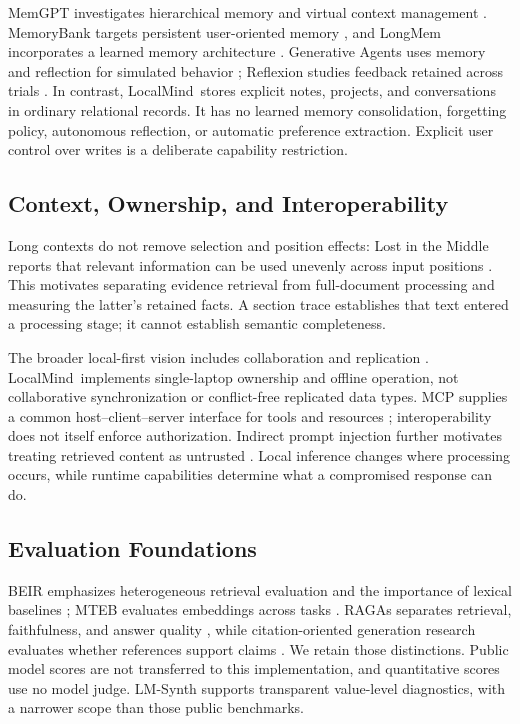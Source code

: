 \documentclass[conference,letterpaper]{IEEEtran}
\newcommand{\method}{LocalMind}
\begin{document}
MemGPT investigates hierarchical memory and virtual context management \cite{memgpt}. MemoryBank targets persistent user-oriented memory \cite{memorybank}, and LongMem incorporates a learned memory architecture \cite{longmem}. Generative Agents uses memory and reflection for simulated behavior \cite{genagents}; Reflexion studies feedback retained across trials \cite{reflexion}. In contrast, \method\ stores explicit notes, projects, and conversations in ordinary relational records. It has no learned memory consolidation, forgetting policy, autonomous reflection, or automatic preference extraction. Explicit user control over writes is a deliberate capability restriction.

\subsection{Context, Ownership, and Interoperability}
Long contexts do not remove selection and position effects: Lost in the Middle reports that relevant information can be used unevenly across input positions \cite{lostmiddle}. This motivates separating evidence retrieval from full-document processing and measuring the latter's retained facts. A section trace establishes that text entered a processing stage; it cannot establish semantic completeness.

The broader local-first vision includes collaboration and replication \cite{localfirst}. \method\ implements single-laptop ownership and offline operation, not collaborative synchronization or conflict-free replicated data types. MCP supplies a common host--client--server interface for tools and resources \cite{mcp}; interoperability does not itself enforce authorization. Indirect prompt injection further motivates treating retrieved content as untrusted \cite{injection}. Local inference changes where processing occurs, while runtime capabilities determine what a compromised response can do.

\subsection{Evaluation Foundations}
BEIR emphasizes heterogeneous retrieval evaluation and the importance of lexical baselines \cite{beir}; MTEB evaluates embeddings across tasks \cite{mteb}. RAGAs separates retrieval, faithfulness, and answer quality \cite{ragas}, while citation-oriented generation research evaluates whether references support claims \cite{alce}. We retain those distinctions. Public model scores are not transferred to this implementation, and quantitative scores use no model judge. LM-Synth supports transparent value-level diagnostics, with a narrower scope than those public benchmarks.
\end{document}
